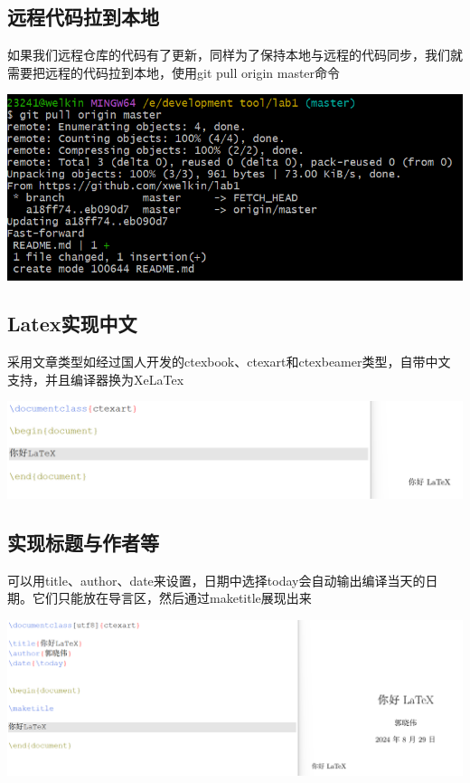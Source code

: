 \documentclass[UTF8,a4paper]{ctexart}
\begin{document}
\begin{sloppypar}
	\subsection{远程代码拉到本地}
	如果我们远程仓库的代码有了更新，同样为了保持本地与远程的代码同步，我们就需要把远程的代码拉到本地，使用git pull origin master命令
	
	\includegraphics[width = 16cm]{12}
	
	\subsection{Latex实现中文}
	采用文章类型如经过国人开发的ctexbook、ctexart和ctexbeamer类型，自带中文支持，并且编译器换为XeLaTex
	
	\includegraphics[width = 16cm]{13}
	
	\subsection{实现标题与作者等}
	可以用title、author、date来设置，日期中选择today会自动输出编译当天的日期。它们只能放在导言区，然后通过maketitle展现出来
	
	\includegraphics[width = 16cm]{14}
	

\end{sloppypar}
\end{document}
